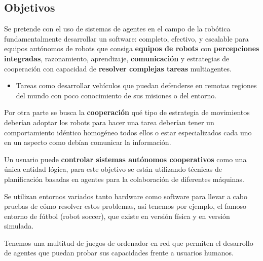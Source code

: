 \documentclass[12pt, twoside, openright]{report} %
\begin{document}
\subsection{Objetivos}
Se pretende con el uso de sistemas de agentes en el campo de la robótica fundamentalmente desarrollar un software: completo, efectivo, y escalable para equipos autónomos de robots que consiga \textbf{equipos de robots} con \textbf{percepciones integradas}, razonamiento, aprendizaje, \textbf{comunicación} y estrategias de cooperación con capacidad de \textbf{resolver complejas tareas} multiagentes.
\begin{itemize}
	\item Tareas como desarrollar vehículos que puedan defenderse en remotas regiones del mundo con poco conocimiento de sus misiones o del entorno.
\end{itemize}

Por otra parte se busca la \textbf{cooperación} qué tipo de estrategia de movimientos deberían adoptar los robots para hacer una tarea deberían tener un comportamiento idéntico homogéneo todos ellos o estar especializados cada uno en un aspecto como debían comunicar la información.

Un usuario puede \textbf{controlar sistemas autónomos cooperativos} como una única entidad lógica, para este objetivo se están utilizando técnicas de planificación basadas en agentes para la colaboración de diferentes máquinas.

Se utilizan entornos variados tanto hardware como software para llevar a cabo pruebas de cómo resolver estos problemas, así tenemos por ejemplo, el famoso entorno de fútbol (robot soccer), que existe en versión física y en versión simulada.

Tenemos una multitud de juegos de ordenador en red que permiten el desarrollo de agentes que puedan probar sus capacidades frente a usuarios humanos.
\end{document}
